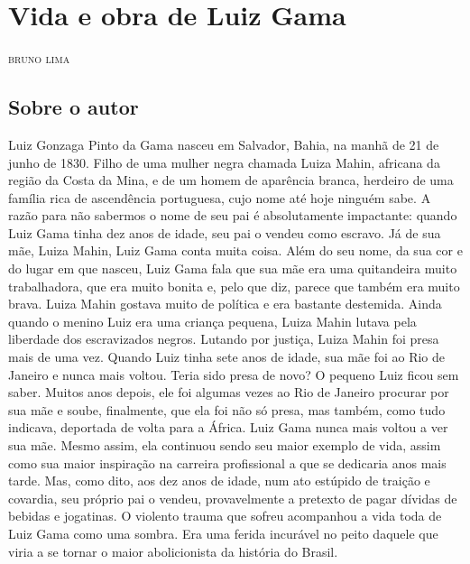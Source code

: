 \chapter{Vida e obra de Luiz Gama}

\begin{flushright}
\textsc{bruno lima}
\end{flushright}

\section{Sobre o autor}

\noindent{}Luiz Gonzaga Pinto da Gama nasceu em Salvador, Bahia, na manhã
de 21 de junho de 1830. Filho de uma mulher negra chamada Luiza Mahin,
africana da região da Costa da Mina, e de um homem de aparência branca,
herdeiro de uma família rica de ascendência portuguesa, cujo nome até
hoje ninguém sabe. A razão para não sabermos o nome de seu pai é
absolutamente impactante: quando Luiz Gama tinha dez anos de idade, seu
pai o vendeu como escravo. Já de sua mãe, Luiza Mahin, Luiz Gama conta
muita coisa. Além do seu nome, da sua cor e do lugar em que nasceu, Luiz
Gama fala que sua mãe era uma quitandeira muito trabalhadora, que era
muito bonita e, pelo que diz, parece que também era muito brava. Luiza
Mahin gostava muito de política e era bastante destemida. Ainda quando o
menino Luiz era uma criança pequena, Luiza Mahin lutava pela liberdade
dos escravizados negros. Lutando por justiça, Luiza Mahin foi presa mais
de uma vez. Quando Luiz tinha sete anos de idade, sua mãe foi ao Rio de
Janeiro e nunca mais voltou. Teria sido presa de novo? O pequeno Luiz
ficou sem saber. Muitos anos depois, ele foi algumas vezes ao Rio de
Janeiro procurar por sua mãe e soube, finalmente, que ela foi não só
presa, mas também, como tudo indicava, deportada de volta para a África.
Luiz Gama nunca mais voltou a ver sua mãe. Mesmo assim, ela continuou
sendo seu maior exemplo de vida, assim como sua maior inspiração na
carreira profissional a que se dedicaria anos mais tarde. Mas, como
dito, aos dez anos de idade, num ato estúpido de traição e covardia, seu
próprio pai o vendeu, provavelmente a pretexto de pagar dívidas de
bebidas e jogatinas. O violento trauma que sofreu acompanhou a vida toda
de Luiz Gama como uma sombra. Era uma ferida incurável no peito daquele
que viria a se tornar o maior abolicionista da história do Brasil.

